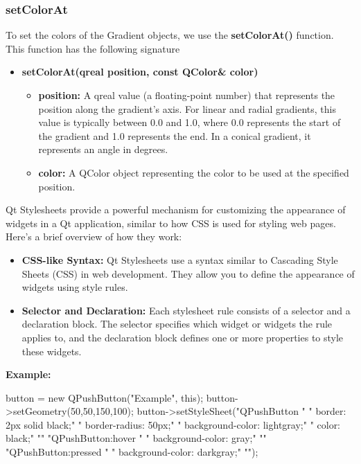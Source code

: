 \documentclass{report}
\begin{document}
    \bigbreak \noindent 
    \subsubsection{setColorAt}
    \bigbreak \noindent 
    To set the colors of the Gradient objects, we use the \textbf{setColorAt()} function. This function has the following signature
    \begin{itemize}
        \item \textbf{setColorAt(qreal position, const QColor\& color)}
            \begin{itemize}
                \item \textbf{position:} A qreal value (a floating-point number) that represents the position along the gradient's axis. For linear and radial gradients, this value is typically between 0.0 and 1.0, where 0.0 represents the start of the gradient and 1.0 represents the end. In a conical gradient, it represents an angle in degrees.
                \item \textbf{color:} A QColor object representing the color to be used at the specified position.
            \end{itemize}
    \end{itemize}


    \pagebreak
    \bigbreak \noindent 
    \begin{concept}
        Qt Stylesheets provide a powerful mechanism for customizing the appearance of widgets in a Qt application, similar to how CSS is used for styling web pages. Here's a brief overview of how they work: 
        \begin{itemize}
            \item \textbf{CSS-like Syntax:} Qt Stylesheets use a syntax similar to Cascading Style Sheets (CSS) in web development. They allow you to define the appearance of widgets using style rules.
            \item \textbf{Selector and Declaration:} Each stylesheet rule consists of a selector and a declaration block. The selector specifies which widget or widgets the rule applies to, and the declaration block defines one or more properties to style these widgets.
        \end{itemize}
    \end{concept}
    \bigbreak \noindent 
    \textbf{Example:}
    \bigbreak \noindent 
    \begin{cppcode}
        button = new QPushButton("Example", this);
        button->setGeometry(50,50,150,100);
        button->setStyleSheet("QPushButton {"
                      "  border: 2px solid black;"  
                      "  border-radius: 50px;"
                      "  background-color: lightgray;"  
                      "  color: black;"  
                      "}"
                      "QPushButton:hover {"
                      "  background-color: gray;"  
                      "}"
                      "QPushButton:pressed {"
                      "  background-color: darkgray;"  
                      "}");
    \end{cppcode}



    







    
    
\end{document}
